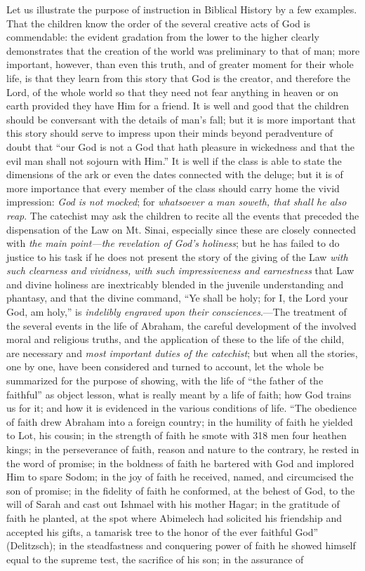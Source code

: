 Let us illustrate the purpose of instruction in Biblical History by a few examples. That the children know the order of the several creative acts of God is commendable: the evident gradation from the lower to the higher clearly demonstrates that the creation of the world was preliminary to that of man; more important, however, than even this truth, and of greater moment for their whole life, is that they learn from this story that God is the creator, and therefore the Lord, of the whole world so that they need not fear anything in heaven or on earth provided they have Him for a friend. It is well and good that the children should be conversant with the details of man’s fall; but it is more important that this story should serve to impress upon their minds beyond peradventure of doubt that “our God is not a God that
hath pleasure in wickedness and that the evil man shall not sojourn with Him.” It is well if the class is able to state the dimensions of the ark or even the dates connected with the deluge; but it is of more importance that every member of the class should carry home the vivid impression: \emph{God is not mocked}; for \emph{whatsoever a man soweth, that shall he also reap}. The catechist may ask the children to recite all the events that preceded the dispensation of the Law on Mt. Sinai, especially since these are closely connected with \emph{the main point—the revelation of God’s holiness}; but he has failed to do justice to his task if he does not present the story of the giving of the Law \emph{with such clearness and vividness, with such impressiveness and earnestness} that Law and divine holiness are inextricably blended in the juvenile understanding and phantasy, and that the divine command, “Ye shall be holy; for I, the Lord your God, am holy,” is \emph{indelibly engraved upon their consciences}.—The treatment of the several events in the life of Abraham, the careful development of the involved moral and religious truths, and the application of these to the life of the child, are necessary and \emph{most important duties of the catechist}; but when all the stories, one by one, have been considered and turned to account, let the whole be summarized for the purpose of showing, with the life of “the father of the faithful” as object lesson, what is really meant by a life of faith; how God trains us for it; and how it is evidenced in the various conditions of life. “The obedience of faith drew Abraham into a foreign country; in the humility of faith he yielded to Lot, his cousin; in the strength of faith he smote with 318 men four heathen kings; in the perseverance of faith, reason and nature to the contrary, he rested in the word of promise; in the boldness of faith he bartered with God and implored Him to spare Sodom; in the joy of faith he received, named, and circumcised the son of promise; in the fidelity of faith he conformed, at the behest of God, to the will of Sarah and cast out Ishmael with his mother Hagar; in the gratitude of faith he planted, at the spot where Abimelech had solicited his friendship and accepted his gifts, a tamarisk tree to the honor of the ever faithful God” (Delitzsch); in the steadfastness and conquering power of faith he showed himself equal to the supreme test, the sacrifice of his son; in the assurance of 